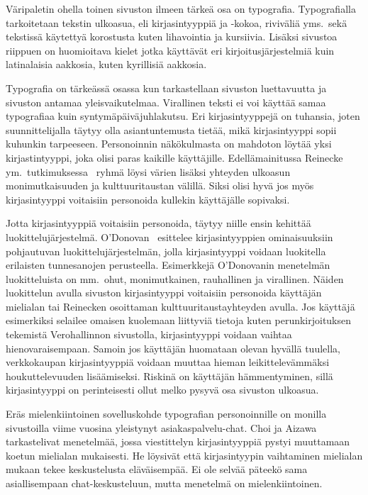 \documentclass[finnish, 12pt, a4paper, elec, utf8, a-1b, online]{aaltothesis}
\begin{document}
Väripaletin ohella toinen sivuston ilmeen tärkeä osa on typografia.
Typografialla tarkoitetaan tekstin ulkoasua, eli kirjasintyyppiä ja -kokoa,
riviväliä yms.~sekä tekstissä käytettyä korostusta kuten lihavointia ja
kursiivia. Lisäksi sivustoa riippuen on huomioitava kielet jotka käyttävät eri
kirjoitusjärjestelmiä kuin latinalaisia aakkosia, kuten kyrillisiä aakkosia.

Typografia on tärkeässä osassa kun tarkastellaan sivuston luettavuutta ja
sivuston antamaa yleisvaikutelmaa. Virallinen teksti ei voi käyttää samaa
typografiaa kuin syntymäpäiväjuhlakutsu. Eri kirjasintyyppejä on tuhansia, joten
suunnittelijalla täytyy olla asiantuntemusta tietää, mikä kirjasintyyppi sopii
kuhunkin tarpeeseen. Personoinnin näkökulmasta on mahdoton löytää yksi
kirjastintyyppi, joka olisi paras kaikille käyttäjille. Edellämainitussa
Reinecke ym.~tutkimuksessa~\cite{10.1145/2556288.2557052} ryhmä löysi värien
lisäksi yhteyden ulkoasun monimutkaisuuden ja kulttuuritaustan välillä. Siksi
olisi hyvä jos myös kirjasintyyppi voitaisiin personoida kullekin käyttäjälle
sopivaksi.

Jotta kirjasintyyppiä voitaisiin personoida, täytyy niille ensin kehittää
luokittelujärjestelmä. O'Donovan~\cite{odonovan_2015} esittelee kirjasintyyppien
ominaisuuksiin pohjautuvan luokittelujärjestelmän, jolla kirjasintyyppi voidaan
luokitella erilaisten tunnesanojen perusteella. Esimerkkejä O'Donovanin
menetelmän luokitteluista on mm.~ohut, monimutkainen, rauhallinen ja virallinen.
Näiden luokittelun avulla sivuston kirjasintyyppi voitaisiin personoida
käyttäjän mielialan tai Reinecken osoittaman kulttuuritaustayhteyden avulla. Jos
käyttäjä esimerkiksi selailee omaisen kuolemaan liittyviä tietoja kuten
perunkirjoituksen tekemistä Verohallinnon sivustolla, kirjasintyyppi voidaan
vaihtaa hienovaraisempaan. Samoin jos käyttäjän huomataan olevan hyvällä
tuulella, verkkokaupan kirjasintyyppiä voidaan muuttaa hieman leikittelevämmäksi
houkuttelevuuden lisäämiseksi. Riskinä on käyttäjän hämmentyminen, sillä
kirjasintyyppi on perinteisesti ollut melko pysyvä osa sivuston ulkoasua.

Eräs mielenkiintoinen sovelluskohde typografian personoinnille on monilla
sivustoilla viime vuosina yleistynyt asiakaspalvelu-chat. Choi ja
Aizawa~\cite{choi_aizawa_2018} tarkastelivat menetelmää, jossa viestittelyn
kirjasintyyppiä pystyi muuttamaan koetun mielialan mukaisesti. He löysivät että
kirjasintyypin vaihtaminen mielialan mukaan tekee keskustelusta eläväisempää. Ei
ole selvää päteekö sama asiallisempaan chat-keskusteluun, mutta menetelmä on
mielenkiintoinen.
\end{document}
